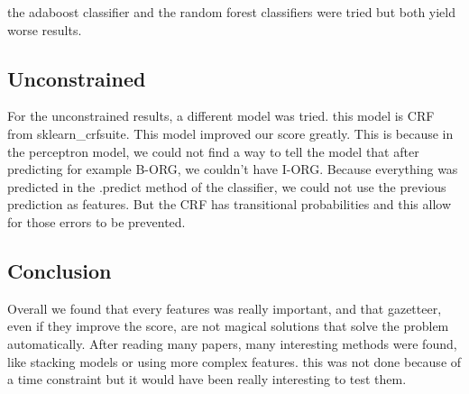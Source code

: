 \documentclass{article}
\begin{document}
the adaboost classifier and  the random forest classifiers were tried but both yield worse results.

\subsection{Unconstrained}
For the unconstrained results, a different model was tried. this model is CRF from sklearn\_crfsuite. This model improved our score greatly. This is because in the perceptron model, we could not find a way to tell the model that after predicting for example B-ORG, we couldn't have I-ORG. Because everything was predicted in the .predict method of the classifier, we could not use the previous prediction as features. But the CRF has transitional probabilities and this allow for those errors to be prevented.

\subsection{Conclusion}
Overall we found that every features was really important, and that gazetteer, even if they improve the score, are not magical solutions that solve the problem automatically. After reading many papers, many interesting methods were found, like stacking models or using more complex features. this was not done because of a time constraint but it would have been really interesting to test them. 
\end{document}
